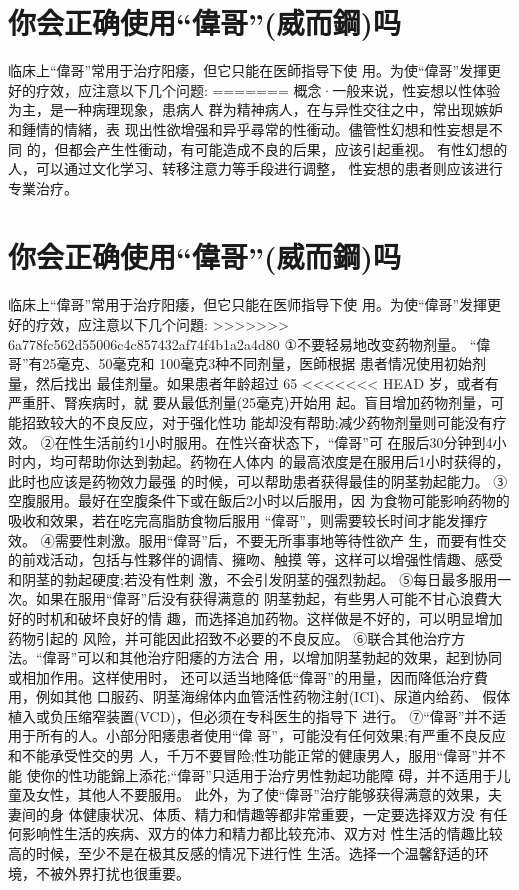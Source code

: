 \documentclass[12pt,UTF8]{ctexbook}
\begin{document}
\section{你会正确使用“偉哥”(威而鋼)吗}

临床上“偉哥”常用于治疗阳痿，但它只能在医師指导下使
用。为使“偉哥”发揮更好的疗效，应注意以下几个问题:
=======
概念·一般来说，性妄想以性体验为主，是一种病理现象，患病人
群为精神病人，在与异性交往之中，常出现嫉妒和鍾情的情緒，表
现出性欲增强和异乎尋常的性衝动。儘管性幻想和性妄想是不同
的，但都会产生性衝动，有可能造成不良的后果，应该引起重视。
有性幻想的人，可以通过文化学习、转移注意力等手段进行调整，
性妄想的患者则应该进行专業治疗。

\section{你会正确使用“偉哥”(威而鋼)吗}

临床上“偉哥”常用于治疗阳痿，但它只能在医师指导下使
用。为使“偉哥”发揮更好的疗效，应注意以下几个问題:
>>>>>>> 6a778fc562d55006c4c857432af74f4b1a2a4d80
①不要轻易地改变药物剂量。
“偉哥”有25毫克、50毫克和
100毫克3种不同剂量，医師根据
患者情况使用初始剂量，然后找出
最佳剂量。如果患者年龄超过 65
<<<<<<< HEAD
岁，或者有严重肝、腎疾病时，就
要从最低剂量(25毫克)开始用
起。盲目增加药物剂量，可能招致较大的不良反应，对于强化性功
能却没有帮助;减少药物剂量则可能没有疗效。
②在性生活前约1小时服用。在性兴奋状态下，“偉哥”可
在服后30分钟到4小时内，均可帮助你达到勃起。药物在人体内
的最高浓度是在服用后1小时获得的，此时也应该是药物效力最强
的时候，可以帮助患者获得最佳的阴茎勃起能力。
③空腹服用。最好在空腹条件下或在飯后2小时以后服用，因
为食物可能影响药物的吸收和效果，若在吃完高脂肪食物后服用
“偉哥”，则需要较长时间才能发揮疗效。
④需要性刺激。服用“偉哥”后，不要无所事事地等待性欲产
生，而要有性交的前戏活动，包括与性夥伴的调情、擁吻、触摸
等，这样可以增强性情趣、感受和阴茎的勃起硬度;若没有性刺
激，不会引发阴茎的强烈勃起。
⑤每日最多服用一次。如果在服用“偉哥”后没有获得满意的
阴茎勃起，有些男人可能不甘心浪費大好的时机和破坏良好的情
趣，而选择追加药物。这样做是不好的，可以明显增加药物引起的
风险，并可能因此招致不必要的不良反应。
⑥联合其他治疗方法。“偉哥”可以和其他治疗阳痿的方法合
用，以增加阴茎勃起的效果，起到协同或相加作用。这样使用时，
还可以适当地降低“偉哥”的用量，因而降低治疗費用，例如其他
口服药、阴茎海绵体内血管活性药物注射(ICI)、尿道内给药、
假体植入或负压缩窄装置(VCD)，但必须在专科医生的指导下
进行。
⑦“偉哥”并不适用于所有的人。小部分阳痿患者使用“偉
哥”，可能没有任何效果;有严重不良反应和不能承受性交的男
人，千万不要冒险;性功能正常的健康男人，服用“偉哥”并不能
使你的性功能錦上添花;“偉哥”只适用于治疗男性勃起功能障
碍，并不适用于儿童及女性，其他人不要服用。
此外，为了使“偉哥”治疗能够获得满意的效果，夫妻间的身
体健康状况、体质、精力和情趣等都非常重要，一定要选择双方没
有任何影响性生活的疾病、双方的体力和精力都比较充沛、双方对
性生活的情趣比较高的时候，至少不是在极其反感的情况下进行性
生活。选择一个温馨舒适的环境，不被外界打扰也很重要。
\end{document}
